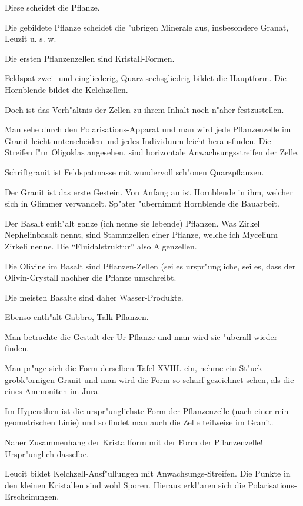 \documentclass[a4paper, 11pt, oneside, german]{article}
\begin{document}
Diese scheidet die Pflanze.

Die gebildete Pflanze scheidet die "ubrigen Minerale aus, insbesondere Granat, Leuzit u. s. w.

Die ersten Pflanzenzellen sind Kristall-Formen.

Feldspat zwei- und eingliederig, Quarz sechsgliedrig bildet die Hauptform. Die Hornblende bildet die Kelchzellen.

Doch ist das Verh"altnis der Zellen zu ihrem Inhalt noch n"aher festzustellen.

Man sehe durch den Polarisations-Apparat und man wird jede Pflanzenzelle im Granit leicht unterscheiden und jedes Individuum leicht herausfinden. Die Streifen f"ur Oligoklas angesehen, sind horizontale Anwachsungsstreifen der Zelle.

Schriftgranit ist Feldspatmasse mit wundervoll sch"onen Quarzpflanzen.

Der Granit ist das erste Gestein. Von Anfang an ist Hornblende in ihm, welcher sich in Glimmer verwandelt. Sp"ater "ubernimmt Hornblende die Bauarbeit.

Der Basalt enth"alt ganze (ich nenne sie lebende) Pflanzen. Was Zirkel Nephelinbasalt nennt, sind Stammzellen einer Pflanze, welche ich Mycelium Zirkeli nenne. Die "`Fluidalstruktur"' also Algenzellen.

Die Olivine im Basalt sind Pflanzen-Zellen (sei es urspr"ungliche, sei es, dass der Olivin-Crystall nachher die Pflanze umschreibt.

Die meisten Basalte sind daher Wasser-Produkte.

Ebenso enth"alt Gabbro, Talk-Pflanzen.

Man betrachte die Gestalt der Ur-Pflanze und man wird sie "uberall wieder finden.

Man pr"age sich die Form derselben Tafel XVIII. ein, nehme ein St"uck grobk"ornigen Granit und man wird die Form so scharf gezeichnet sehen, als die eines Ammoniten im Jura.

Im Hypersthen ist die urspr"unglichste Form der Pflanzenzelle (nach einer rein geometrischen Linie) und so findet man auch die Zelle teilweise im Granit.

Naher Zusammenhang der Kristallform mit der Form der Pflanzenzelle! Urspr"unglich dasselbe.

Leucit bildet Kelchzell-Ausf"ullungen mit Anwachsungs-Streifen. Die Punkte in den kleinen Kristallen sind wohl Sporen. Hieraus erkl"aren sich die Polarisations-Erscheinungen.
\end{document}
